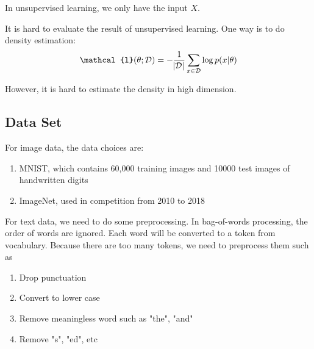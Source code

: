 In unsupervised learning, we only have the input $X$.

It is hard to evaluate the result of unsupervised learning. One way is to do density estimation:
\begin{equation}
    \mathcal{l}(\theta; \mathcal{D}) = - \frac{1}{\absolutevalue{\mathcal{D}}} \sum_{x \in \mathcal{D}} \log p(x|\theta)
\end{equation}

However, it is hard to estimate the density in high dimension.



\subsection{Data Set}

\begin{example}
    For image data, the data choices are:
\begin{enumerate}
    \item MNIST, which contains 60,000 training images and 10000 test images of handwritten digits
    \item ImageNet, used in competition from 2010 to 2018
\end{enumerate}
\end{example}

\begin{definition}
    For text data, we need to do some preprocessing. In bag-of-words processing, the order of words are ignored. Each word will be converted to a token from vocabulary. Because there are too many tokens, we need to preprocess them such as 
\begin{enumerate}
    \item Drop punctuation
    \item Convert to lower case
    \item Remove meaningless word such as "the", "and"
    \item Remove "s", "ed", etc
\end{enumerate}
\end{definition}

